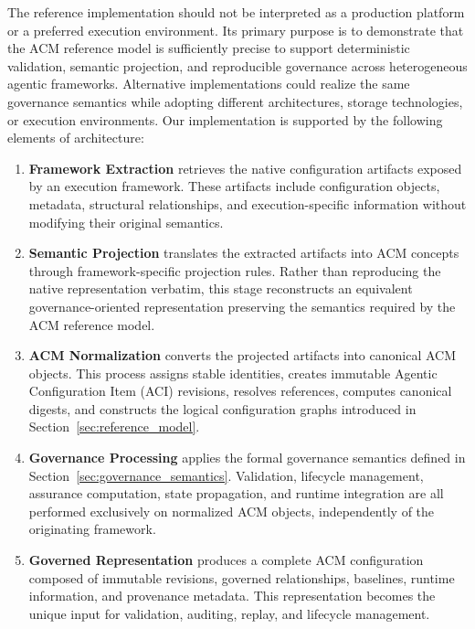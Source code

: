\documentclass[10pt]{article}
\begin{document}
The reference implementation should not be interpreted as a production platform or a preferred execution environment. Its primary purpose is to demonstrate that the ACM reference model is sufficiently precise to support deterministic validation, semantic projection, and reproducible governance across heterogeneous agentic frameworks. Alternative implementations could realize the same governance semantics while adopting different architectures, storage technologies, or execution environments. Our implementation is supported by the following elements of architecture:

\begin{enumerate}
    \item \textbf{Framework Extraction} retrieves the native configuration artifacts exposed by an execution framework. These artifacts include configuration objects, metadata, structural relationships, and execution-specific information without modifying their original semantics.

    \item \textbf{Semantic Projection} translates the extracted artifacts into ACM concepts through framework-specific projection rules. Rather than reproducing the native representation verbatim, this stage reconstructs an equivalent governance-oriented representation preserving the semantics required by the ACM reference model.

    \item \textbf{ACM Normalization} converts the projected artifacts into canonical ACM objects. This process assigns stable identities, creates immutable Agentic Configuration Item (ACI) revisions, resolves references, computes canonical digests, and constructs the logical configuration graphs introduced in Section~\ref{sec:reference_model}.

    \item \textbf{Governance Processing} applies the formal governance semantics defined in Section~\ref{sec:governance_semantics}. Validation, lifecycle management, assurance computation, state propagation, and runtime integration are all performed exclusively on normalized ACM objects, independently of the originating framework.

    \item \textbf{Governed Representation} produces a complete ACM configuration composed of immutable revisions, governed relationships, baselines, runtime information, and provenance metadata. This representation becomes the unique input for validation, auditing, replay, and lifecycle management.
\end{enumerate}
\end{document}
